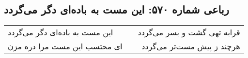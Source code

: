 \begin{center}
\section*{رباعی شماره ۵۷۰: این مست به باده‌ای دگر می‌گردد}
\label{sec:0570}
\begin{longtable}{l p{0.5cm} r}
این مست به باده‌ای دگر می‌گردد
&&
قرابه تهی گشت و بسر می‌گردد
\\
ای محتسب این مست مرا دره مزن
&&
هرچند ز پیش مست‌تر می‌گردد
\\
\end{longtable}
\end{center}
